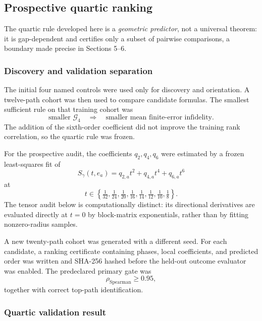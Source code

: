 \documentclass[11pt]{article}
\newcommand{\cG}{\mathcal{G}}
\begin{document}
\subsection{Prospective quartic ranking}

The quartic rule developed here is a \emph{geometric predictor}, not a universal theorem: it is gap-dependent and certifies only a subset of pairwise comparisons, a boundary made precise in Sections 5--6.

\subsubsection{Discovery and validation separation}

The initial four named controls were used only for discovery and orientation. A twelve-path cohort was then used to compare candidate formulas. The smallest sufficient rule on that training cohort was
\[
\text{smaller }\cG_4
\quad\Longrightarrow\quad
\text{smaller mean finite-error infidelity}.
\]
The addition of the sixth-order coefficient did not improve the training rank correlation, so the quartic rule was frozen.

For the prospective audit, the coefficients $q_2,q_4,q_6$ were estimated by a frozen least-squares fit of
\[
S_\gamma(t,e_a)=q_{2,a}t^2+q_{4,a}t^4+q_{6,a}t^6
\]
at
\[
t\in\left\{\tfrac1{32},\tfrac1{24},\tfrac1{20},\tfrac1{16},\tfrac1{14},\tfrac1{12},\tfrac1{10},\tfrac18\right\}.
\]
The tensor audit below is computationally distinct: its directional derivatives are evaluated directly at $t=0$ by block-matrix exponentials, rather than by fitting nonzero-radius samples.

A new twenty-path cohort was generated with a different seed. For each candidate, a ranking certificate containing phases, local coefficients, and predicted order was written and SHA-256 hashed before the held-out outcome evaluator was enabled. The predeclared primary gate was
\[
\rho_{\mathrm{Spearman}}\ge0.95,
\]
together with correct top-path identification.

\subsubsection{Quartic validation result}
\end{document}
